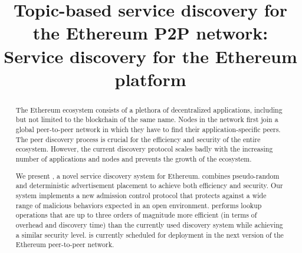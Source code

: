 \documentclass[conference]{IEEEtran}
\begin{document}
\title{Topic-based service discovery for the Ethereum P2P network}
\title{\sysname: Service discovery for the Ethereum platform}
\author{}
\maketitle
    \vspace{-0.90in}
\begin{abstract}
	
	
The Ethereum ecosystem consists of a plethora of decentralized applications, including but not limited to the blockchain of the same name. Nodes in the network first join a global peer-to-peer network in which they have to find their application-specific peers. The peer discovery process is crucial for the efficiency and security of the entire ecosystem. However, the current discovery protocol scales badly with the increasing number of applications and nodes and prevents the growth of the ecosystem.

We present \sysname, a novel service discovery system for Ethereum. \sysname combines pseudo-random and deterministic advertisement placement to achieve both efficiency and security. Our system implements a new admission control protocol that protects against a wide range of malicious behaviors expected in an open environment. 
\sysname performs lookup operations that are up to three orders of magnitude more efficient (in terms of overhead and discovery time) than the currently used discovery system while achieving a similar security level.  \sysname is currently scheduled for deployment in the next version of the Ethereum peer-to-peer network. 

\end{abstract}


%


\end{document}

